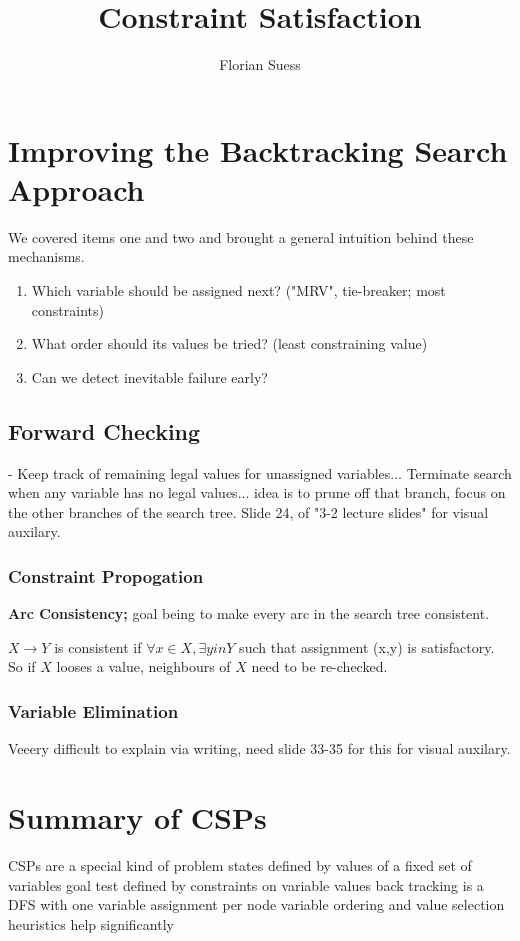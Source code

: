 \documentclass{article}
\begin{document}
\title{Constraint Satisfaction}
\date{}
\author{Florian Suess}
\maketitle

\section{Improving the Backtracking Search Approach}
We covered items one and two and brought a general intuition behind these mechanisms.

\begin{enumerate}
	\item Which variable should be assigned next? ("MRV", tie-breaker; most constraints)
	\item What order should its values be tried? (least constraining value)
	\item Can we detect inevitable failure early?
\end{enumerate}

\subsection{Forward Checking}
- Keep track of remaining legal values for unassigned variables... Terminate search when any variable has no legal values... idea is to prune off that branch, focus on the other branches of the search tree. Slide 24, of "3-2 lecture slides" for visual auxilary.

\subsubsection{Constraint Propogation}
\textbf{Arc Consistency;} goal being to make every arc in the search tree consistent.

$X \rightarrow Y$ is consistent if $\forall x \in X, \exists y in Y$ such that assignment (x,y) is satisfactory. So if $X$ looses a value, neighbours of $X$ need to be re-checked.

\subsubsection{Variable Elimination}
Veeery difficult to explain via writing, need slide 33-35 for this for visual auxilary.

\section{Summary of CSPs}
\begin{outline}
	\1 CSPs are a special kind of problem
		\2 states defined by values of a fixed set of variables
		\2 goal test defined by constraints on variable values
	\1 back tracking is a DFS with one variable assignment per node
	\1 variable ordering and value selection heuristics help significantly
\end{outline}
\end{document}
